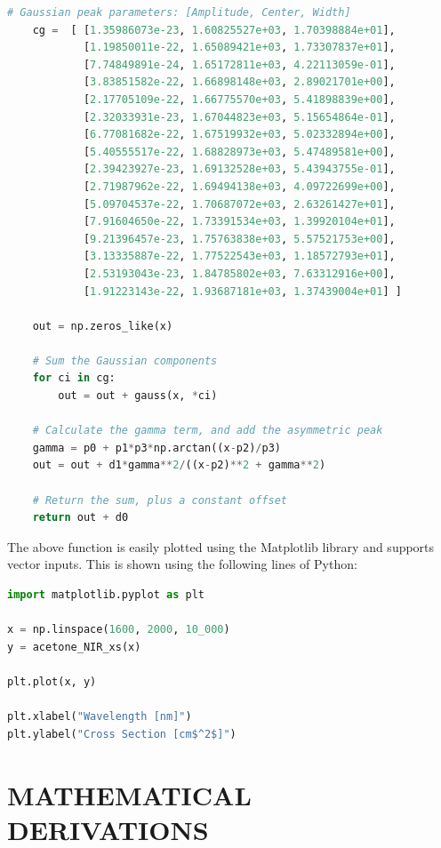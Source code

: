 \begin{singlespace}
\begin{lstlisting}[language=Python, basicstyle=\ttfamily\footnotesize]
    # Gaussian peak parameters: [Amplitude, Center, Width]
    cg =  [ [1.35986073e-23, 1.60825527e+03, 1.70398884e+01],
            [1.19850011e-22, 1.65089421e+03, 1.73307837e+01],
            [7.74849891e-24, 1.65172811e+03, 4.22113059e-01],
            [3.83851582e-22, 1.66898148e+03, 2.89021701e+00],
            [2.17705109e-22, 1.66775570e+03, 5.41898839e+00],
            [2.32033931e-23, 1.67044823e+03, 5.15654864e-01],
            [6.77081682e-22, 1.67519932e+03, 5.02332894e+00],
            [5.40555517e-22, 1.68828973e+03, 5.47489581e+00],
            [2.39423927e-23, 1.69132528e+03, 5.43943755e-01],
            [2.71987962e-22, 1.69494138e+03, 4.09722699e+00],
            [5.09704537e-22, 1.70687072e+03, 2.63261427e+01],
            [7.91604650e-22, 1.73391534e+03, 1.39920104e+01],
            [9.21396457e-23, 1.75763838e+03, 5.57521753e+00],
            [3.13335887e-22, 1.77522543e+03, 1.18572793e+01],
            [2.53193043e-23, 1.84785802e+03, 7.63312916e+00],
            [1.91223143e-22, 1.93687181e+03, 1.37439004e+01] ]

    out = np.zeros_like(x)

    # Sum the Gaussian components
    for ci in cg:
        out = out + gauss(x, *ci)
    
    # Calculate the gamma term, and add the asymmetric peak
    gamma = p0 + p1*p3*np.arctan((x-p2)/p3)
    out = out + d1*gamma**2/((x-p2)**2 + gamma**2)
    
    # Return the sum, plus a constant offset
    return out + d0
\end{lstlisting}
\end{singlespace}
The above function is easily plotted using the Matplotlib library and supports vector inputs. This is shown using the following lines of Python:
\begin{singlespace}
\begin{lstlisting}[language=Python, basicstyle=\ttfamily\footnotesize]
import matplotlib.pyplot as plt

x = np.linspace(1600, 2000, 10_000)
y = acetone_NIR_xs(x)

plt.plot(x, y)

plt.xlabel("Wavelength [nm]")
plt.ylabel("Cross Section [cm$^2$]")
\end{lstlisting}
\end{singlespace}


\chapter{MATHEMATICAL DERIVATIONS}

